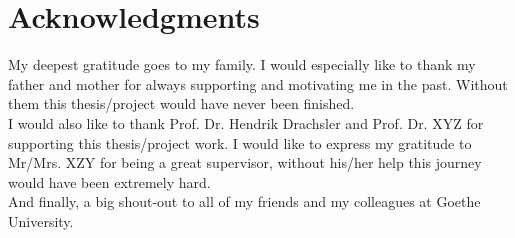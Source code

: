 \chapter*{Acknowledgments}
\label{cha:acknowledgments}


\noindent
My deepest gratitude goes to my family. I would especially like to thank my father and mother for always supporting and motivating me in the past. Without them this thesis/project would have never been finished.\\

\noindent
I would also like to thank Prof. Dr. Hendrik Drachsler and Prof. Dr. XYZ for supporting this thesis/project work. I would like to express my gratitude to Mr/Mrs. XZY for being a great supervisor, without his/her help this journey would have been extremely hard.\\

\noindent
And finally, a big shout-out to all of my friends and my colleagues at Goethe University.